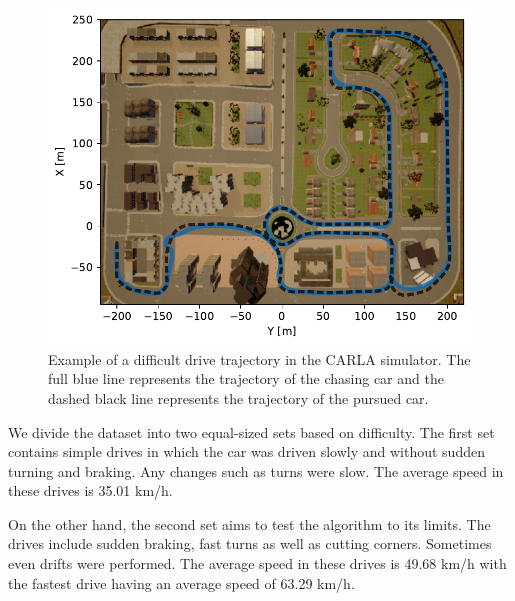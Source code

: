\documentclass{ctuthesis/ctuthesis}
\begin{document}
\begin{figure}[]
    \centering
    \includegraphics[width=1\textwidth]{images/trajectory_img_h.pdf}
    \caption[Example of a difficult drive trajectory in the CARLA simulator]{Example of a difficult drive trajectory in the CARLA simulator. The full blue line represents the trajectory of the chasing car and the dashed black line represents the trajectory of the pursued car. }\label{f:trajectory}
\end{figure}


We divide the dataset into two equal-sized sets based on difficulty. The first set contains simple drives in which the car was driven slowly and without sudden turning and braking. Any changes such as turns were slow. The average speed in these drives is 35.01 km/h.\par


On the other hand, the second set aims to test the algorithm to its limits. The drives include sudden braking, fast turns as well as cutting corners. Sometimes even drifts were performed. The average speed in these drives is 49.68 km/h with the fastest drive having an average speed of 63.29 km/h. %


    
\end{document}
